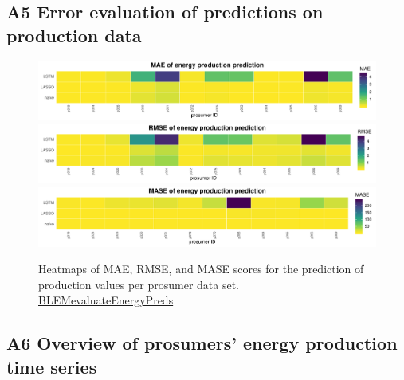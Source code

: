 \subsection*{\hypertarget{AppA5:Figures:heatmaps_p}{A5} Error evaluation of predictions on production data}\label{AppA5:Figures:heatmaps_p}

\begin{figure}[H]
    \centering
    \includegraphics[width=\textwidth]{thesis/graphs/evaluation/p_heatmap_MAE.pdf}
    \includegraphics[width=\textwidth]{thesis/graphs/evaluation/p_heatmap_RMSE.pdf}
    \includegraphics[width=\textwidth]{thesis/graphs/evaluation/p_heatmap_MASE.pdf}
    \caption[Heatmaps of error measures for production values]{Heatmaps of MAE, RMSE, and MASE scores for the prediction of production values per prosumer data set. \quantnet\href{https://github.com/QuantLet/BLEM/tree/master/BLEMevaluateEnergyPreds}{BLEMevaluateEnergyPreds}}
\end{figure}


\subsection*{\hypertarget{AppA6:Figures:producer_all}{A6} Overview of prosumers' energy production time series}\label{AppA6:Figures:producer_all}

